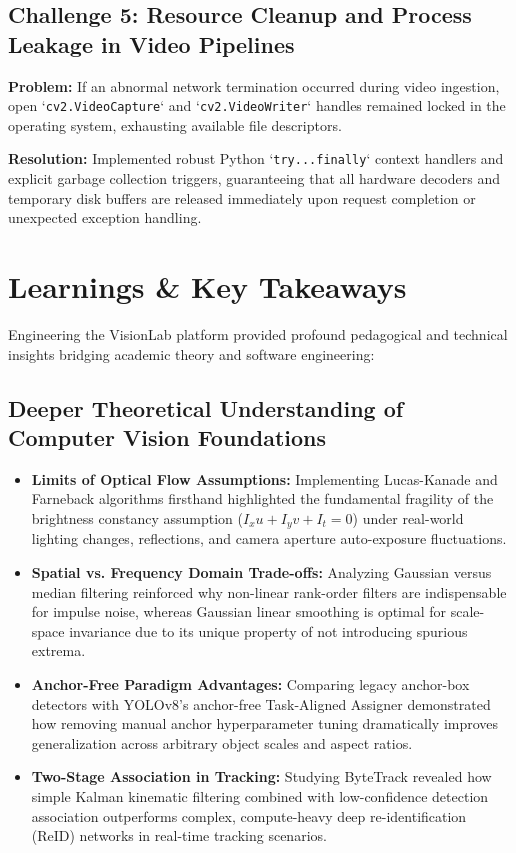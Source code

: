 \subsection{Challenge 5: Resource Cleanup and Process Leakage in Video Pipelines}
\textbf{Problem:} If an abnormal network termination occurred during video ingestion, open `\texttt{cv2.VideoCapture}` and `\texttt{cv2.VideoWriter}` handles remained locked in the operating system, exhausting available file descriptors.

\textbf{Resolution:} Implemented robust Python `\texttt{try...finally}` context handlers and explicit garbage collection triggers, guaranteeing that all hardware decoders and temporary disk buffers are released immediately upon request completion or unexpected exception handling.

\clearpage

\section{Learnings \& Key Takeaways}

Engineering the VisionLab platform provided profound pedagogical and technical insights bridging academic theory and software engineering:

\subsection{Deeper Theoretical Understanding of Computer Vision Foundations}
\begin{itemize}
    \item \textbf{Limits of Optical Flow Assumptions:} Implementing Lucas-Kanade and Farneback algorithms firsthand highlighted the fundamental fragility of the brightness constancy assumption ($I_x u + I_y v + I_t = 0$) under real-world lighting changes, reflections, and camera aperture auto-exposure fluctuations.
    \item \textbf{Spatial vs. Frequency Domain Trade-offs:} Analyzing Gaussian versus median filtering reinforced why non-linear rank-order filters are indispensable for impulse noise, whereas Gaussian linear smoothing is optimal for scale-space invariance due to its unique property of not introducing spurious extrema.
    \item \textbf{Anchor-Free Paradigm Advantages:} Comparing legacy anchor-box detectors with YOLOv8's anchor-free Task-Aligned Assigner demonstrated how removing manual anchor hyperparameter tuning dramatically improves generalization across arbitrary object scales and aspect ratios.
    \item \textbf{Two-Stage Association in Tracking:} Studying ByteTrack revealed how simple Kalman kinematic filtering combined with low-confidence detection association outperforms complex, compute-heavy deep re-identification (ReID) networks in real-time tracking scenarios.
\end{itemize}

